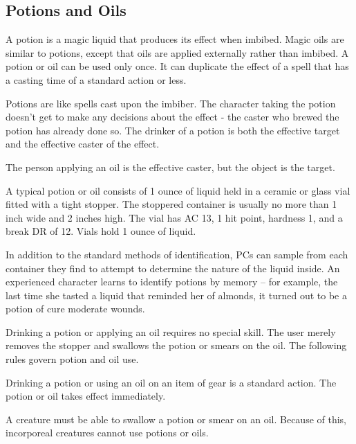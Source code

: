         \subsection{Potions and Oils}

            A potion is a magic liquid that produces its effect when imbibed.
            Magic oils are similar to potions, except that oils are applied externally rather than imbibed.
            A potion or oil can be used only once.
            It can duplicate the effect of a spell that has a casting time of a standard action or less.

            Potions are like spells cast upon the imbiber.
            The character taking the potion doesn't get to make any decisions about the effect  - the caster who brewed the potion has already done so.
            The drinker of a potion is both the effective target and the effective caster of the effect.

            The person applying an oil is the effective caster, but the object is the target.

             A typical potion or oil consists of 1 ounce of liquid held in a ceramic or glass vial fitted with a tight stopper.
            The stoppered container is usually no more than 1 inch wide and 2 inches high.
            The vial has AC 13, 1 hit point, hardness 1, and a break DR of 12.
            Vials hold 1 ounce of liquid.

             In addition to the standard methods of identification, PCs can sample from each container they find to attempt to determine the nature of the liquid inside.
            An experienced character learns to identify potions by memory -- for example, the last time she tasted a liquid that reminded her of almonds, it turned out to be a potion of cure moderate wounds.

             Drinking a potion or applying an oil requires no special skill.
            The user merely removes the stopper and swallows the potion or smears on the oil.
            The following rules govern potion and oil use.

            Drinking a potion or using an oil on an item of gear is a standard action.
            The potion or oil takes effect immediately.

            A creature must be able to swallow a potion or smear on an oil.
            Because of this, incorporeal creatures cannot use potions or oils.

